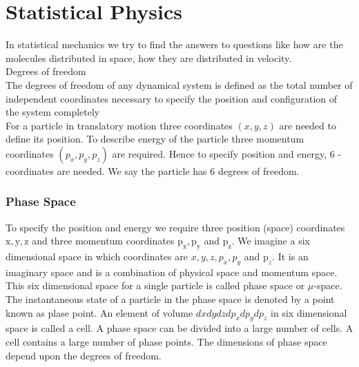 \chapter{Statistical Physics}
\par In statistical mechanics we try to find the answers to questions like how are the molecules distributed in space, how they are distributed in velocity.\\
Degrees of freedom\\
The degrees of freedom of any dynamical system is defined as the total number of independent coordinates necessary to specify the position and configuration of the system completely\\
For a particle in translatory motion three coordinates $(x, y, z)$ are needed to define its position. To describe energy of the particle three momentum coordinates $\left(p_{x}, p_{y}, p_{z}\right)$ are required. Hence to specify position and energy, 6 -coordinates are needed. We say the particle has 6 degrees of freedom.
\subsection{Phase Space}
To specify the position and energy we require three position (space) coordinates $\mathrm{x}, \mathrm{y}, \mathrm{z}$ and three momentum coordinates $\mathrm{p}_{\mathrm{x}}, \mathrm{p}_{\mathrm{y}}$ and $\mathrm{p}_{\mathrm{z}}$. We imagine a six dimensional space in which coordinates are $x, y, z, p_{x}, p_{y}$ and $\mathrm{p}_{z}$. It is an imaginary space and is a combination of physical space and momentum space. This six dimensional space for a single particle is called phase space or $\mu$-space. The instantaneous state of a particle in the phase space is denoted by a point known as plase point. An element of volume $d x d y d z d p_{x} d p_{y} d p_{z}$ in six dimensional space is called a cell. A phase space can be divided into a large number of cells. A cell contains a large number of phase points. The dimensions of phase space depend upon the degrees of freedom.
